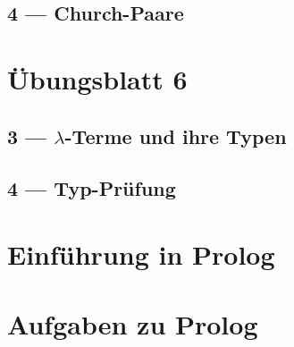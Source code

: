 \documentclass{beamer}
\begin{document}

\subsection{4 --- Church-Paare}


\section{Übungsblatt 6}

\subsection{3 --- $\lambda$-Terme und ihre Typen}


\subsection{4 --- Typ-Prüfung}


\section{Einführung in Prolog}


\section{Aufgaben zu Prolog}

\end{document}
